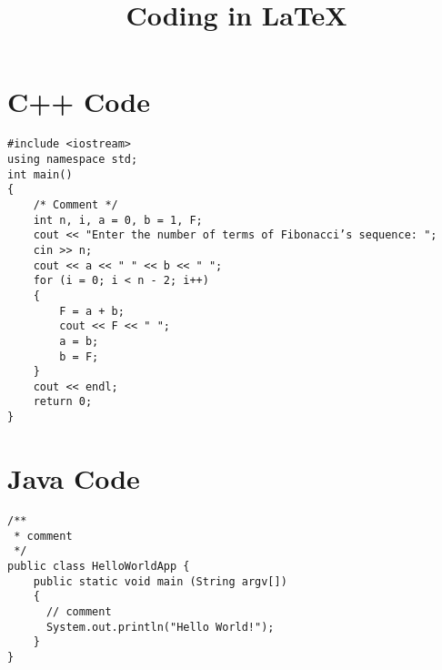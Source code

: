 \documentclass[a4paper]{article}
\title{ Coding in \LaTeX}
\date{}
\begin{document}
\maketitle

\section*{C++ Code}

\begin{lstlisting}[style=CPP]
#include <iostream>
using namespace std;
int main()
{
    /* Comment */
    int n, i, a = 0, b = 1, F;
    cout << "Enter the number of terms of Fibonacci’s sequence: ";
    cin >> n;
    cout << a << " " << b << " ";
    for (i = 0; i < n - 2; i++)
    {
        F = a + b;
        cout << F << " ";
        a = b;
        b = F;
    }
    cout << endl;
    return 0;
}
\end{lstlisting}

\section*{Java Code}

\begin{lstlisting}[style=Java]
/**
 * comment
 */
public class HelloWorldApp {
    public static void main (String argv[])
    {
      // comment
      System.out.println("Hello World!");
    }
}
\end{lstlisting}
\end{document}
